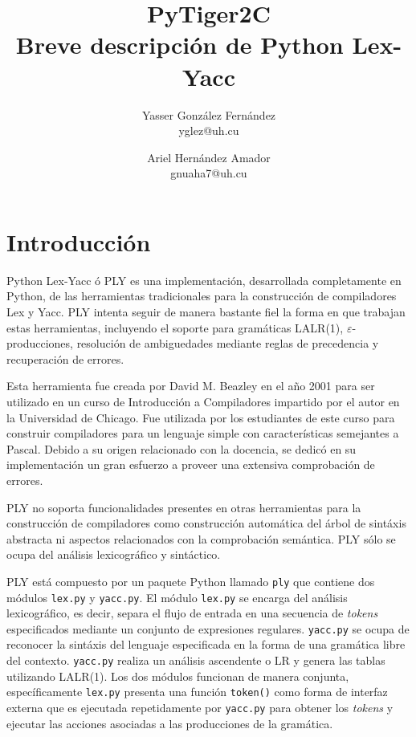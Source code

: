 \documentclass{article}
\title{
	\LARGE{PyTiger2C} \\
	\Large{Breve descripción de Python Lex-Yacc}
}
\author{
  	Yasser González Fernández \\
  	\small{yglez@uh.cu}
  	\and
  	Ariel Hernández Amador \\
  	\small{gnuaha7@uh.cu}
}
\date{}
\begin{document}
\maketitle

\thispagestyle{empty}

\newpage

\setcounter{page}{1}

\section{Introducción}

Python Lex-Yacc ó PLY es una implementación, desarrollada completamente en
Python, de las herramientas tradicionales para la construcción de compiladores
Lex y Yacc. PLY intenta seguir de manera bastante fiel la forma en que
trabajan estas herramientas, incluyendo el soporte para gramáticas LALR(1),
$\varepsilon$-producciones, resolución de ambiguedades mediante reglas de
precedencia y recuperación de errores.

Esta herramienta fue creada por David M. Beazley en el año 2001 para ser
utilizado en un curso de Introducción a Compiladores impartido por el autor en
la Universidad de Chicago. Fue utilizada por los estudiantes de este curso
para construir compiladores para un lenguaje simple con características
semejantes a Pascal. Debido a su origen relacionado con la docencia, se dedicó
en su implementación un gran esfuerzo a proveer una extensiva comprobación de
errores.

PLY no soporta funcionalidades presentes en otras herramientas para la
construcción de compiladores como construcción automática del árbol de sintáxis
abstracta ni aspectos relacionados con la comprobación semántica. PLY sólo se
ocupa del análisis lexicográfico y sintáctico.

PLY está compuesto por un paquete Python llamado \texttt{ply} que contiene
dos módulos \texttt{lex.py} y \texttt{yacc.py}. El módulo \texttt{lex.py} se
encarga del análisis lexicográfico, es decir, separa el flujo de entrada en una
secuencia de \textit{tokens} especificados mediante un conjunto de expresiones
regulares. \texttt{yacc.py} se ocupa de reconocer la sintáxis del lenguaje
especificada en la forma de una gramática libre del contexto. \texttt{yacc.py}
realiza un análisis ascendente o LR y genera las tablas utilizando LALR(1). Los
dos módulos funcionan de manera conjunta, específicamente \texttt{lex.py}
presenta una función \texttt{token()} como forma de interfaz externa que es
ejecutada repetidamente por \texttt{yacc.py} para obtener los \textit{tokens} y
ejecutar las acciones asociadas a las producciones de la gramática.
\end{document}
